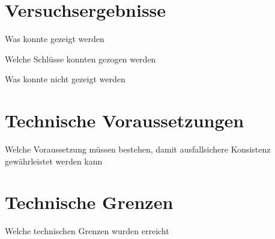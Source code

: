 \section{Versuchsergebnisse}

Was konnte gezeigt werden

Welche Schlüsse konnten gezogen werden

Was konnte nicht gezeigt werden

\section{Technische Voraussetzungen}
Welche Voraussetzung müssen bestehen, damit ausfallsichere Konsistenz gewährleistet werden kann

\section{Technische Grenzen}
Welche technischen Grenzen wurden erreicht


